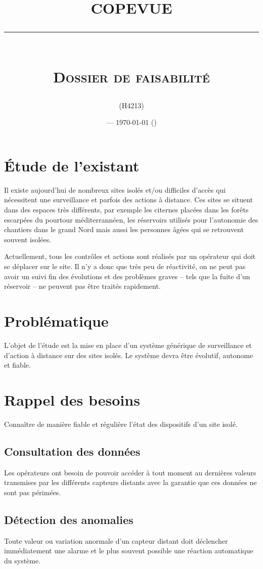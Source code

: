 \documentclass[a4paper, 11pt]{article}
\title{\textbf{COPEVUE}\\
\rule{\textwidth}{1pt}{}\\
\Huge{\textsc{Dossier de faisabilité}}}
\author{\docauthor{} (H4213)}
\date{\docname{} --- \today{} (\docstatus{})}
\begin{document}
\maketitle

\tableofcontents

\pagebreak


\section{Étude de l'existant}
    Il existe aujourd'hui de nombreux sites isolés et/ou difficiles d'accès qui nécessitent une surveillance et parfois des actions à distance. Ces sites se situent dans des espaces très différents, par exemple les citernes placées dans les forêts escarpées du pourtour méditerrannéen, les réservoirs utilisés pour l'autonomie des chantiers dans le grand Nord mais aussi les personnes âgées qui se retrouvent souvent isolées.

    Actuellement, tous les contrôles et actions sont réalisés par un opérateur qui doit se déplacer sur le site. Il n'y a donc que très peu de réactivité, on ne peut pas avoir un suivi fin des évolutions et des problèmes graves -- tels que la fuite d'un réservoir -- ne peuvent pas être traités rapidement.

\section{Problématique}
    L'objet de l'étude est la mise en place d'un système générique de surveillance et d'action à distance sur des sites isolés. Le système devra être évolutif, autonome et fiable.
\section{Rappel des besoins}
     Connaître de manière fiable et régulière l'état des dispositifs d'un site isolé.
    \subsection{Consultation des données} %
        Les opérateurs ont besoin de pouvoir accéder à tout moment au dernières valeurs transmises par les différents capteurs distants avec la garantie que ces données ne sont pas périmées.

    \subsection{Détection des anomalies} %
        Toute valeur ou variation anormale d'un capteur distant doit déclencher immédiatement une alarme et le plus souvent possible une réaction automatique du système.
\end{document}
